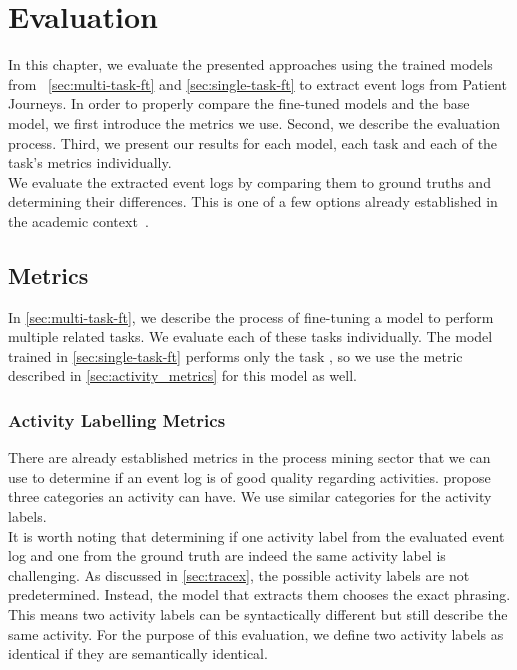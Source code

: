 \section{Evaluation}\label{sec:eval}
In this chapter, we evaluate the presented approaches using the trained models from ~\autoref{sec:multi-task-ft} and \autoref{sec:single-task-ft} to extract event logs from Patient Journeys. In order to properly compare the fine-tuned models and the base model, we first introduce the metrics we use. Second, we describe the evaluation process. Third, we present our results for each model, each task and each of the task's metrics individually.\\
We evaluate the extracted event logs by comparing them to ground truths and determining their differences. This is one of a few options already established in the academic context~\cite{latif_fine-tuning_2024}.

\subsection{Metrics}\label{sec:metrics}
In \autoref{sec:multi-task-ft}, we describe the process of fine-tuning a model to perform multiple related tasks. We evaluate each of these tasks individually. The model trained in \autoref{sec:single-task-ft} performs only the task , so we use the metric described in \autoref{sec:activity_metrics} for this model as well.

\subsubsection{Activity Labelling Metrics}\label{sec:activity_metrics}
There are already established metrics in the process mining sector that we can use to determine if an event log is of good quality regarding activities. \cite{van_der_aalst_process_2016, carmona_conformance_2018} propose three categories an activity can have. We use similar categories for the activity labels.\\
It is worth noting that determining if one activity label from the evaluated event log and one from the ground truth are indeed the same activity label is challenging. As discussed in \autoref{sec:tracex}, the possible activity labels are not predetermined. Instead, the model that extracts them chooses the exact phrasing. This means two activity labels can be syntactically different but still describe the same activity. For the purpose of this evaluation, we define two activity labels as identical if they are semantically identical.
